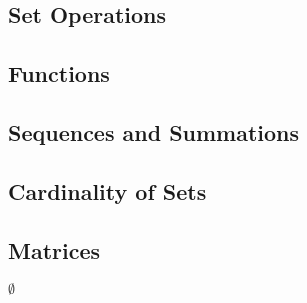 \documentclass[11pt]{article}
\begin{document}
\subsection{Set Operations}
\label{sec-2-2}
\subsection{Functions}
\label{sec-2-3}
\subsection{Sequences and Summations}
\label{sec-2-4}
\subsection{Cardinality of Sets}
\label{sec-2-5}
\subsection{Matrices}
\label{sec-2-6}




$\emptyset$
\end{document}
